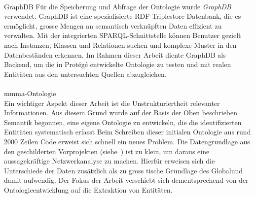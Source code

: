 \documentclass[12pt, a4paper, ngerman, bidi=default]{article}
\makeatletter
\let\oldparagraph\paragraph%
\renewcommand{\paragraph}{
    \@ifstar%
      \xxxParagraphStar%
      \xxxParagraphNoStar%
 }
\newcommand{\xxxParagraphStar}[1]{\oldparagraph*{#1}\mbox{}}
\newcommand{\xxxParagraphNoStar}[1]{\oldparagraph{#1}\mbox{}}
\makeatother
\begin{document}
\paragraph{GraphDB} Für die Speicherung und Abfrage der Ontologie wurde \textit{GraphDB} verwendet. 
GraphDB ist eine spezialisierte RDF-Triplestore-Datenbank, die es ermöglicht, 
grosse Mengen an semantisch verknüpften Daten effizient zu verwalten. 
Mit der integrierten SPARQL-Schnittstelle können Benutzer gezielt nach Instanzen, Klassen und Relationen suchen 
und komplexe Muster in den Datenbeständen erkennen. 
Im Rahmen dieser Arbeit diente GraphDB als Backend, um die in Protégé entwickelte Ontologie zu testen 
und mit realen Entitäten aus den untersuchten Quellen abzugleichen.



\noindent
\begin{minipage}[t]{0.52\textwidth}
  \justifying
\paragraph{mmma-Ontologie}\\
Ein wichtiger Aspekt dieser Arbeit ist die Unstrukturiertheit relevanter Informationen. 
Aus diesem Grund wurde auf der Basis der Oben beschrieben Semantik begonnen, eine eigene Ontologie zu entwickeln, die die identifizierten Entitäten systematisch erfasst\footnotemark
Beim Schreiben dieser initialen Ontologie aus rund 2000 Zeilen Code erweist sich schnell ein neues Problem. Die Datengrundlage aus den geschilderten Vorprojekten (siehe~) ist 
zu klein, um daraus eine aussagekräftige Netzwerkanalyse zu machen. Hierfür erweisen sich die Unterschiede der Daten zusätzlich als zu gross tische Grundlage des Globalund damit aufwendig. Der Fokus der Arbeit verschiebt sich dementsprechend von der Ontologieentwicklung 
auf die Extraktion von Entitäten.
\end{minipage}%
\hfill%
\end{document}
